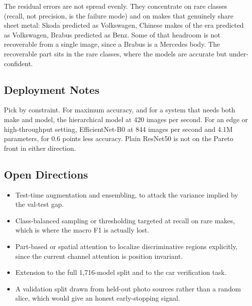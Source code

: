 The residual errors are not spread evenly. They concentrate on rare classes (recall, not precision, is the failure mode) and on makes that genuinely share sheet metal: Skoda predicted as Volkswagen, Chinese makes of the era predicted as Volkswagen, Brabus predicted as Benz. Some of that headroom is not recoverable from a single image, since a Brabus is a Mercedes body. The recoverable part sits in the rare classes, where the models are accurate but under-confident.

\subsection{Deployment Notes}

Pick by constraint. For maximum accuracy, and for a system that needs both make and model, the hierarchical model at 420 images per second. For an edge or high-throughput setting, EfficientNet-B0 at 844 images per second and 4.1M parameters, for 0.6 points less accuracy. Plain ResNet50 is not on the Pareto front in either direction.

\subsection{Open Directions}

\begin{itemize}
    \item Test-time augmentation and ensembling, to attack the variance implied by the val-test gap.
    \item Class-balanced sampling or thresholding targeted at recall on rare makes, which is where the macro F1 is actually lost.
    \item Part-based or spatial attention to localize discriminative regions explicitly, since the current channel attention is position invariant.
    \item Extension to the full 1,716-model split and to the car verification task.
    \item A validation split drawn from held-out photo sources rather than a random slice, which would give an honest early-stopping signal.
\end{itemize}
